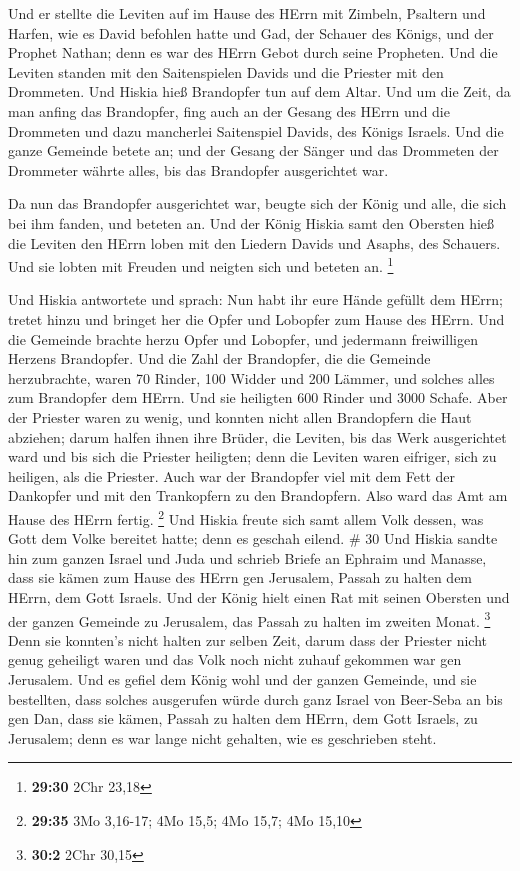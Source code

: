  Und er stellte die Leviten auf im Hause des HErrn mit
Zimbeln, Psaltern und Harfen, wie es David befohlen hatte und Gad, der
Schauer des Königs, und der Prophet Nathan; denn es war des HErrn Gebot
durch seine Propheten.  Und die Leviten standen mit den
Saitenspielen Davids und die Priester mit den Drommeten. 
Und Hiskia hieß Brandopfer tun auf dem Altar. Und um die Zeit, da man
anfing das Brandopfer, fing auch an der Gesang des HErrn und die
Drommeten und dazu mancherlei Saitenspiel Davids, des Königs Israels.
 Und die ganze Gemeinde betete an; und der Gesang der
Sänger und das Drommeten der Drommeter währte alles, bis das Brandopfer
ausgerichtet war.

 Da nun das Brandopfer ausgerichtet war, beugte sich der
König und alle, die sich bei ihm fanden, und beteten an. 
Und der König Hiskia samt den Obersten hieß die Leviten den HErrn loben
mit den Liedern Davids und Asaphs, des Schauers. Und sie lobten mit
Freuden und neigten sich und beteten an. \footnote{\textbf{29:30} 2Chr
  23,18}

 Und Hiskia antwortete und sprach: Nun habt ihr eure Hände
gefüllt dem HErrn; tretet hinzu und bringet her die Opfer und Lobopfer
zum Hause des HErrn. Und die Gemeinde brachte herzu Opfer und Lobopfer,
und jedermann freiwilligen Herzens Brandopfer.  Und die
Zahl der Brandopfer, die die Gemeinde herzubrachte, waren 70 Rinder, 100
Widder und 200 Lämmer, und solches alles zum Brandopfer dem HErrn.
 Und sie heiligten 600 Rinder und 3000 Schafe.
 Aber der Priester waren zu wenig, und konnten nicht allen
Brandopfern die Haut abziehen; darum halfen ihnen ihre Brüder, die
Leviten, bis das Werk ausgerichtet ward und bis sich die Priester
heiligten; denn die Leviten waren eifriger, sich zu heiligen, als die
Priester.  Auch war der Brandopfer viel mit dem Fett der
Dankopfer und mit den Trankopfern zu den Brandopfern. Also ward das Amt
am Hause des HErrn fertig. \footnote{\textbf{29:35} 3Mo 3,16-17; 4Mo
  15,5; 4Mo 15,7; 4Mo 15,10}  Und Hiskia freute sich samt
allem Volk dessen, was Gott dem Volke bereitet hatte; denn es geschah
eilend. \# 30  Und Hiskia sandte hin zum ganzen Israel und
Juda und schrieb Briefe an Ephraim und Manasse, dass sie kämen zum Hause
des HErrn gen Jerusalem, Passah zu halten dem HErrn, dem Gott Israels.
 Und der König hielt einen Rat mit seinen Obersten und der
ganzen Gemeinde zu Jerusalem, das Passah zu halten im zweiten Monat.
\footnote{\textbf{30:2} 2Chr 30,15}  Denn sie konnten's
nicht halten zur selben Zeit, darum dass der Priester nicht genug
geheiligt waren und das Volk noch nicht zuhauf gekommen war gen
Jerusalem.  Und es gefiel dem König wohl und der ganzen
Gemeinde,  und sie bestellten, dass solches ausgerufen würde
durch ganz Israel von Beer-Seba an bis gen Dan, dass sie kämen, Passah
zu halten dem HErrn, dem Gott Israels, zu Jerusalem; denn es war lange
nicht gehalten, wie es geschrieben steht.

